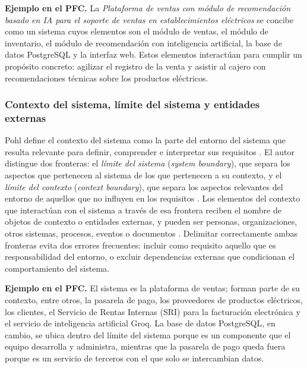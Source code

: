 \documentclass[onecolumn,12pt,a4paper]{IEEEtran}
\begin{document}
\textbf{Ejemplo en el PFC.} La \emph{Plataforma de ventas con m\'odulo de recomendaci\'on basado en IA para el soporte de ventas en establecimientos el\'ectricos} se concibe como un sistema cuyos elementos son el m\'odulo de ventas, el m\'odulo de inventario, el m\'odulo de recomendaci\'on con inteligencia artificial, la base de datos PostgreSQL y la interfaz web. Estos elementos interact\'uan para cumplir un prop\'osito concreto: agilizar el registro de la venta y asistir al cajero con recomendaciones t\'ecnicas sobre los productos el\'ectricos.

\subsubsection{Contexto del sistema, l\'imite del sistema y entidades externas}
Pohl define el contexto del sistema como la parte del entorno del sistema que resulta relevante para definir, comprender e interpretar sus requisitos \cite{pohl2025}. El autor distingue dos fronteras: el \emph{l\'imite del sistema} (\emph{system boundary}), que separa los aspectos que pertenecen al sistema de los que pertenecen a su contexto, y el \emph{l\'imite del contexto} (\emph{context boundary}), que separa los aspectos relevantes del entorno de aquellos que no influyen en los requisitos \cite{pohl2025}. Los elementos del contexto que interact\'uan con el sistema a trav\'es de esa frontera reciben el nombre de objetos de contexto o entidades externas, y pueden ser personas, organizaciones, otros sistemas, procesos, eventos o documentos \cite{pohl2025,iso15288}. Delimitar correctamente ambas fronteras evita dos errores frecuentes: incluir como requisito aquello que es responsabilidad del entorno, o excluir dependencias externas que condicionan el comportamiento del sistema.

\textbf{Ejemplo en el PFC.} El sistema es la plataforma de ventas; forman parte de su contexto, entre otros, la pasarela de pago, los proveedores de productos el\'ectricos, los clientes, el Servicio de Rentas Internas (SRI) para la facturaci\'on electr\'onica y el servicio de inteligencia artificial Groq. La base de datos PostgreSQL, en cambio, se ubica dentro del l\'imite del sistema porque es un componente que el equipo desarrolla y administra, mientras que la pasarela de pago queda fuera porque es un servicio de terceros con el que solo se intercambian datos.
\end{document}
